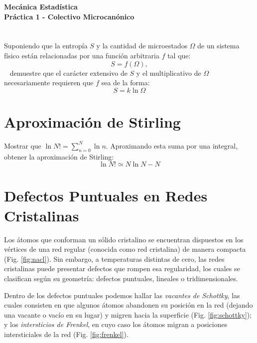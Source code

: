 \documentclass[a4paper,11pt]{article}
\begin{document}
\pagestyle{fancy}
\chead{\small \the\year}



\thispagestyle{plain}
\begin{center}
    \textbf{\large
        Mecánica Estadística \\
        Práctica 1 - Colectivo Microcanónico
    }
\end{center}
\vspace{-1.5em}



\section{}

 Suponiendo que la entropía $S$ y la cantidad de microestados 
$\Omega$ de un sistema físico están relacionadas por una función 
arbitraria $f$ tal que:
~
$$ S = f(\Omega), $$
~
\noindent demuestre que el carácter extensivo de $S$ y el multiplicativo de 
$\Omega$ necesariamente requieren que $f$ sea de la forma:
~
$$ S = k \ln \Omega $$



\section{Aproximación de Stirling}

Mostrar que $\ln N! = \sum_{n=0}^N \ln n$.
Aproximando esta suma por una integral, obtener la aproximación de 
Stirling:
~
$$ \ln N! \simeq N \ln N - N $$



\section{Defectos Puntuales en Redes Cristalinas}

Los átomos que conforman un sólido cristalino se encuentran 
dispuestos en los vértices de una red regular (conocida como red 
cristalina) de manera compacta (Fig. \ref{fig:nacl}).
Sin embargo, a temperaturas distintas de cero, las redes cristalinas 
puede presentar defectos que rompen esa regularidad, los cuales se 
clasifican según su geometría: defectos puntuales, lineales o 
tridimensionales.

Dentro de los defectos puntuales podemos hallar las \emph{vacantes de 
Schottky}, las cuales consisten en que algunos átomos abandonen su 
posición en la red (dejando una vacante o vacío en su lugar) y migren 
hacia la superficie (Fig. \ref{fig:schottky}); y los \emph{intersticios 
de Frenkel}, en cuyo caso los átomos migran a posiciones intersticiales 
de la red (Fig. \ref{fig:frenkel}).
\end{document}
